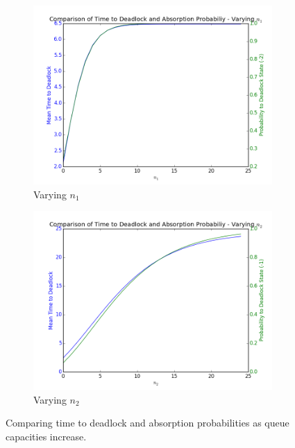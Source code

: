 \documentclass{article}
\begin{document}
\begin{figure}[!htbp]
  \begin{subfigure}[b]{0.5\textwidth}
    \includegraphics[width=\textwidth]{images/comparetimeprobn1}
    \caption{Varying $n_1$}
    \label{fig:comparetimeprob_n1}
  \end{subfigure}
  \begin{subfigure}[b]{0.5\textwidth}
    \includegraphics[width=\textwidth]{images/comparetimeprobn2}
    \caption{Varying $n_2$}
    \label{fig:comparetimeprob_n2}
  \end{subfigure}
  \caption{Comparing time to deadlock and absorption probabilities as queue capacities increase.}
  \label{fig:comparetimeprob_ns}
\end{figure}
\end{document}
